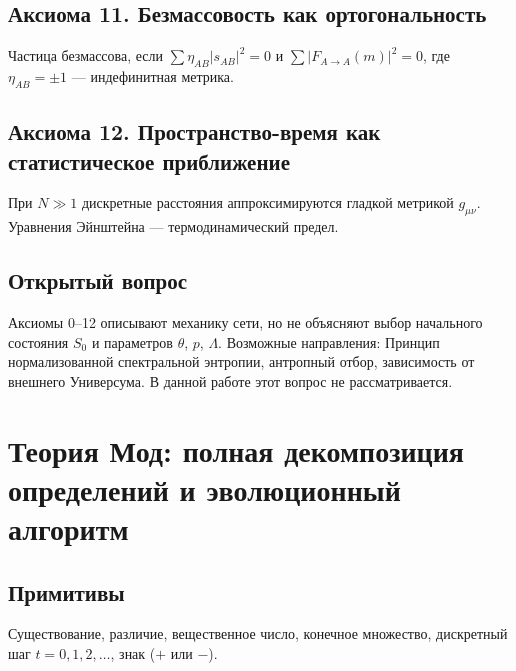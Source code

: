 \documentclass[12pt,a4paper]{article}
\begin{document}
\subsection{Аксиома 11. Безмассовость как ортогональность}
Частица безмассова, если $\sum \eta_{AB} |s_{AB}|^2 = 0$ и $\sum |F_{A \to A}(m)|^2 = 0$, где $\eta_{AB} = \pm 1$ --- индефинитная метрика.

\subsection{Аксиома 12. Пространство-время как статистическое приближение}
При $N \gg 1$ дискретные расстояния аппроксимируются гладкой метрикой $g_{\mu\nu}$. Уравнения Эйнштейна --- термодинамический предел.

\subsection{Открытый вопрос}
Аксиомы 0--12 описывают механику сети, но не объясняют выбор начального состояния $S_0$ и параметров $\theta$, $p$, $\Lambda$. Возможные направления: Принцип нормализованной спектральной энтропии, антропный отбор, зависимость от внешнего Универсума. В данной работе этот вопрос не рассматривается.

\newpage
\section{Теория Мод: полная декомпозиция определений и эволюционный алгоритм}

\begin{abstract}
Представлена полная декомпозиция всех понятий Теории Мод на нерекурсивные определения. Каждое понятие определено через более простые или через примитивы, не допуская логических циклов. На основе этих определений сформулирован эволюционный алгоритм, описывающий рост сети частиц и мод за дискретные шаги. Алгоритм готов к программной реализации.

\bigskip
\noindent\textbf{Ключевые слова:} Теория Мод, декомпозиция определений, эволюционный алгоритм, без рекурсий.
\end{abstract}

\subsection{Примитивы}
Существование, различие, вещественное число, конечное множество, дискретный шаг $t = 0, 1, 2, \dots$, знак ($+$ или $-$).
\end{document}
